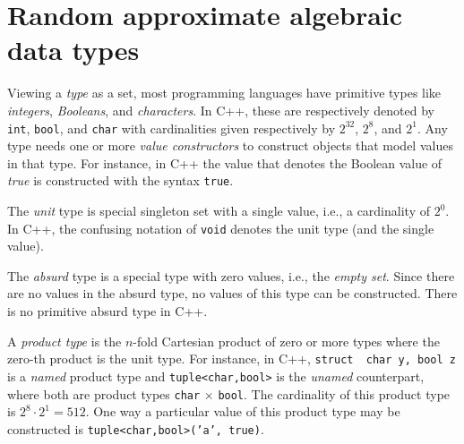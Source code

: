 \documentclass[ ../main.tex]{subfiles}
\begin{document}
\section{Random approximate algebraic data types}
Viewing a \emph{type} as a set, most programming languages have primitive types like \emph{integers}, \emph{Booleans}, and \emph{characters}.
In C++, these are respectively denoted by \texttt{int}, \texttt{bool}, and \texttt{char} with cardinalities given respectively by $2^{32}$, $2^8$, and $2^1$.
Any type needs one or more \emph{value constructors} to construct objects that model values in that type.
For instance, in C++ the value that denotes the Boolean value of \emph{true} is constructed with the syntax \texttt{true}.

The \emph{unit} type is special singleton set with a single value, i.e., a cardinality of $2^0$.
In C++, the confusing notation of \texttt{void} denotes the unit type (and the single value).
\begin{remark}
The \emph{absurd} type is a special type with zero values, i.e., the \emph{empty set}.
Since there are no values in the absurd type, no values of this type can be constructed.
There is no primitive absurd type in C++.
\end{remark}

A \emph{product type} is the $n$-fold Cartesian product of zero or more types where the zero-th product is the unit type.
For instance, in C++, \texttt{struct { char y, bool z }} is a \emph{named} product type and \texttt{tuple<char,bool>}
is the \emph{unamed} counterpart, where both are product types \texttt{char} $\times$ \texttt{bool}.
The cardinality of this product type is $2^8 \cdot 2^1 = 512$.
One way a particular value of this product type may be constructed is \texttt{tuple<char,bool>('a', true)}.
\end{document}

